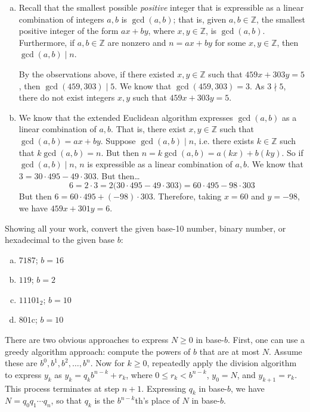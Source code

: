 \documentclass[11pt,letterpaper]{article}
\begin{document}
\begin{enumerate}[(a)]
\item Recall that the smallest possible \textit{positive} integer that is expressible as a linear combination of integers $a, b$ is $\gcd(a, b)$; that is, given $a, b \in \mathbb{Z}$, the smallest positive integer of the form $ax + by$, where $x, y \in \mathbb{Z}$, is $\gcd(a, b)$. Furthermore, if $a, b \in \mathbb{Z}$ are nonzero and $n= ax + by$ for some $x, y \in \mathbb{Z}$, then $\gcd(a, b) \mid n$. 

By the observations above, if there existed $x, y \in \mathbb{Z}$ such that $459x + 303y= 5$, then $\gcd(459, 303) \mid 5$. We know that $\gcd(459, 303)= 3$. As $3 \nmid 5$, there do not exist integers $x, y$ such that $459x + 303y= 5$. \pspace

\item We know that the extended Euclidean algorithm expresses $\gcd(a, b)$ as a linear combination of $a, b$. That is, there exist $x, y \in \mathbb{Z}$ such that $\gcd(a, b)= ax + by$. Suppose $\gcd(a, b) \mid n$, i.e. there exists $k \in \mathbb{Z}$ such that $k \gcd(a, b)= n$. But then $n= k \gcd(a, b)= a(kx) + b(ky)$. So if $\gcd(a, b) \mid n$, $n$ is expressible as a linear combination of $a, b$. We know that $3= 30 \cdot 495 - 49 \cdot 303$. But then\dots
	\[
	6= 2 \cdot 3= 2 \big( 30 \cdot 495 - 49 \cdot 303 \big)= 60 \cdot 495 - 98 \cdot 303
	\]
But then $6= 60 \cdot 495 + (-98) \cdot 303$. Therefore, taking $x= 60$ and $y= -98$, we have $459x + 301y= 6$. 
\end{enumerate}



\newpage



 Showing all your work, convert the given base-10 number, binary number, or hexadecimal to the given base $b$:
	\begin{enumerate}[(a)]
	\item $7187$; $b= 16$
	\item $119$; $b= 2$
	\item $11101_2$; $b= 10$
	\item $801\text{c}$; $b= 10$
	\end{enumerate} \pspace

\sol There are two obvious approaches to express $N \geq 0$ in base-$b$. First, one can use a greedy algorithm approach: compute the powers of $b$ that are at most $N$. Assume these are $b^0, b^1, b^2, \ldots, b^n$. Now for $k \geq 0$, repeatedly apply the division algorithm to express $y_k$ as $y_k= q_k b^{n - k} + r_k$, where $0 \leq r_k < b^{n - k}$, $y_0= N$, and $y_{k+1}= r_k$. This process terminates at step $n+1$. Expressing $q_k$ in base-$b$, we have $N= q_0 q_1 \cdots q_n$, so that $q_k$ is the $b^{n - k}$th's place of $N$ in base-$b$. \pspace
\end{document}

